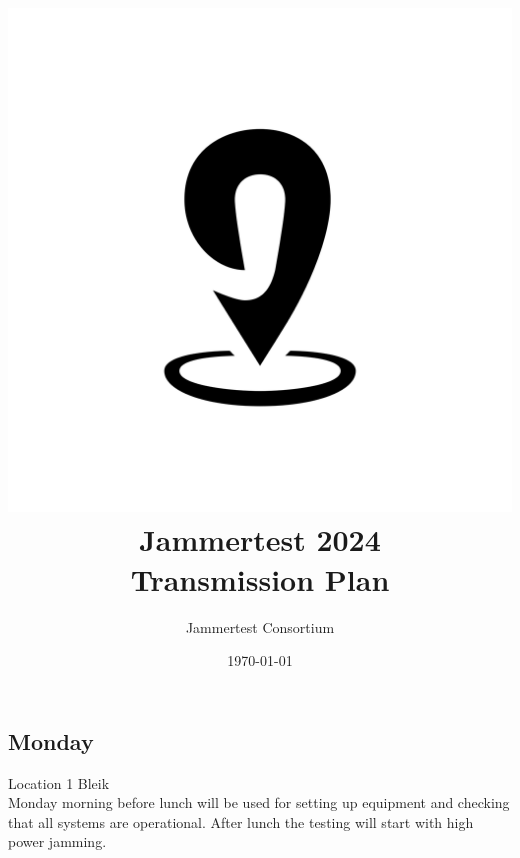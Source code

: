\documentclass[a4paper]{book}
\title{\includegraphics[scale=0.2]{graphics/jampin.png}\\ Jammertest 2024 \\ \huge{Transmission Plan}}
\author{Jammertest Consortium}
\date{\today \\ \DTMcurrenttime}
\begin{document}
\maketitle

\tableofcontents
\restoregeometry



\begin{landscape}
\chapter{Monday}
\Large Location 1 Bleik \\
Monday morning before lunch will be used for setting up equipment and checking that all systems are operational. After lunch the testing will start with high power jamming.

%
\end{landscape}
\end{document}
